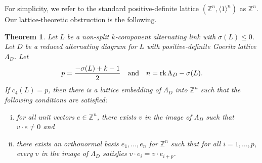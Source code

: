 \documentclass[a4paper,11pt]{amsart}
\newtheorem{thm}{Theorem}%
\theoremstyle{definition}
\theoremstyle{remark}
\numberwithin{equation}{section}
\newcommand{\Z}{\mathbb{Z}}
\newcommand{\rk}{{\rm rk}\,}
\begin{document}
For simplicity, we refer to the standard positive-definite lattice $(\Z^n,\langle 1\rangle^n)$ as $\Z^n$. Our lattice-theoretic obstruction is the following.
\begin{thm}\label{thm:lattice_obstruction}
Let $L$ be a non-split $k$-component alternating link with $\sigma(L)\leq 0$. Let $D$ be a reduced alternating diagram for $L$ with positive-definite Goeritz lattice $\Lambda_D$. Let 
\[p=\frac{-\sigma(L)+k-1}{2} \quad\text{and}\quad n=\rk \Lambda_D-\sigma(L).\] If $c_4(L)=p$, then there is a lattice embedding of $\Lambda_D$ into $\Z^n$ such that the following conditions are satisfied:
\begin{enumerate}[(i)]
    \item\label{it:all_coords} for all unit vectors $e\in \Z^n$, there exists $v$ in the image of $\Lambda_D$ such that $v\cdot e\neq 0$ and
    \item\label{it:u_disjoint_supports} there exists an orthonormal basis $e_1,\dots, e_n$ for $\Z^n$ such that for all $i=1, \dots, p$, every $v$ in the image of $\Lambda_D$ satisfies $v\cdot e_{i}=v\cdot e_{i+p}$.
\end{enumerate}
\end{thm}
\end{document}

